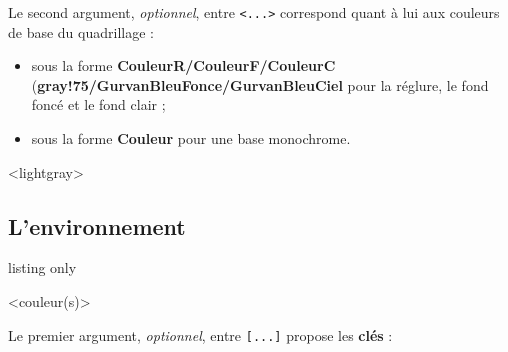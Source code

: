 \documentclass[a4paper]{article}
\newcommand\Cle[1]{{\bfseries\sffamily\textlangle #1\textrangle}}
\begin{document}
Le second argument, \textit{optionnel}, entre \texttt{<...>} correspond quant à lui aux couleurs de base du quadrillage :

\begin{itemize}
	\item sous la forme \Cle{CouleurR/CouleurF/CouleurC} (\Cle{gray!75/GurvanBleuFonce/GurvanBleuCiel} pour la réglure, le fond foncé et le fond clair ;
	\item sous la forme \Cle{Couleur} pour une base monochrome.
\end{itemize}

\begin{PresentationCode}{}
\PapierGurvan[Interligne=3,NbCarreaux=10x2,Marge=2]
\end{PresentationCode}

\begin{PresentationCode}{}
\PapierGurvan[Interligne=2,NbCarreaux=14x3,Marge=1]<lightgray>
\end{PresentationCode}

\subsection{L'environnement}

\begin{PresentationCode}{listing only}

\begin{EnvGurvan}[clés]<couleur(s)>
\end{EnvGurvan}
\end{PresentationCode}

Le premier argument, \textit{optionnel}, entre \texttt{[...]} propose les \Cle{clés} :
\end{document}
